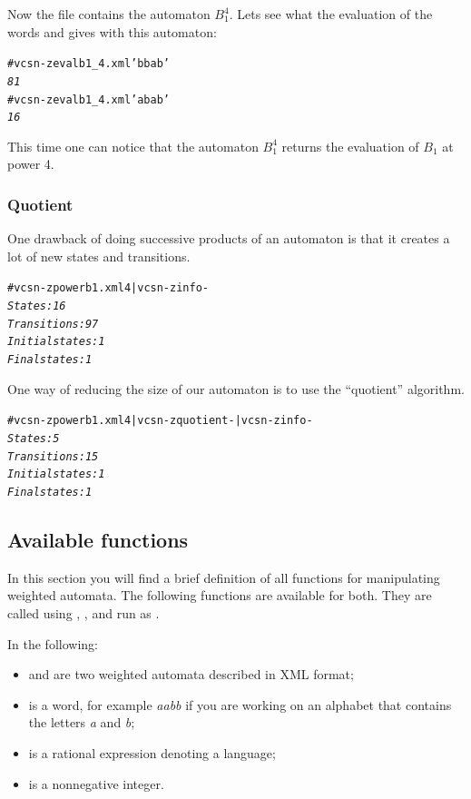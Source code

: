 Now the file  contains the automaton $B_1^4$. Lets see
what the evaluation of the words  and  gives
with this automaton:

\begin{alltt}
# vcsn-z eval b1_4.xml 'bbab'
\textit{81}
# vcsn-z eval b1_4.xml 'abab'
\textit{16}
\end{alltt}

This time one can notice that the automaton $B_1^4$ returns the
evaluation of $B_1$ at power 4.

\subsubsection{Quotient}

One drawback of doing successive products of an automaton is
that it creates a lot of new states and transitions.
\begin{alltt}
# vcsn-z power b1.xml 4 | vcsn-z info -
\textit{States: 16}
\textit{Transitions: 97}
\textit{Initial states: 1}
\textit{Final states: 1}
\end{alltt}
One way of reducing the size of our automaton is to use the
``quotient'' algorithm.
\begin{alltt}
# vcsn-z power b1.xml 4 | vcsn-z quotient - | vcsn-z info -
\textit{States: 5}
\textit{Transitions: 15}
\textit{Initial states: 1}
\textit{Final states: 1}
\end{alltt}

\subsection{Available functions}
In this section you will find a brief definition of all functions for
manipulating weighted automata. The following functions are available
for both.  They are called using ,
, and  run as
  .

\smallskip

In the following:

\begin{itemize}
\item {} and  are two weighted automata
  described in \Vauc XML format;
\item {} is a word, for example \textit{aabb} if you are
  working on an alphabet that contains the letters \textit{a} and
  \textit{b};
\item {} is a rational expression denoting a language;
\item {} is a nonnegative integer.
\end{itemize}
\newpage

